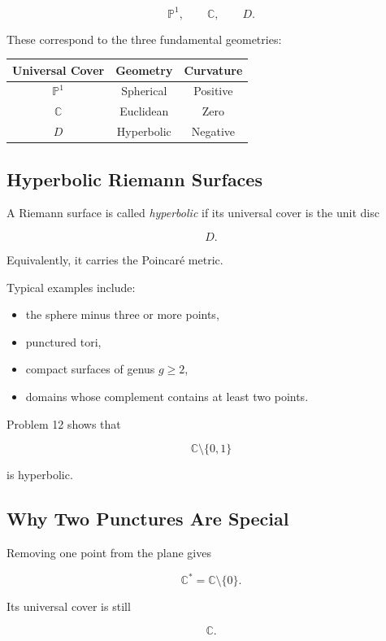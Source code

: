 \documentclass[12pt,a4paper]{article}
\theoremstyle{notespace}
\begin{document}
\[
\mathbb P^1,
\qquad
\mathbb C,
\qquad
D.
\]

These correspond to the three fundamental geometries:

\begin{center}
	\begin{tabular}{|c|c|c|}
		\hline
		Universal Cover & Geometry & Curvature\\
		\hline
		\(\mathbb P^1\) & Spherical & Positive\\
		\hline
		\(\mathbb C\) & Euclidean & Zero\\
		\hline
		\(D\) & Hyperbolic & Negative\\
		\hline
	\end{tabular}
\end{center}

\subsection{Hyperbolic Riemann Surfaces}

A Riemann surface is called \emph{hyperbolic} if its universal cover is the unit disc

\[
D.
\]

Equivalently, it carries the Poincaré metric.

Typical examples include:

\begin{itemize}
	\item the sphere minus three or more points,
	\item punctured tori,
	\item compact surfaces of genus \(g\ge2\),
	\item domains whose complement contains at least two points.
\end{itemize}

Problem 12 shows that

\[
\mathbb C\setminus\{0,1\}
\]

is hyperbolic.

\subsection{Why Two Punctures Are Special}

Removing one point from the plane gives

\[
\mathbb C^*
=
\mathbb C\setminus\{0\}.
\]

Its universal cover is still

\[
\mathbb C.
\]
\end{document}
